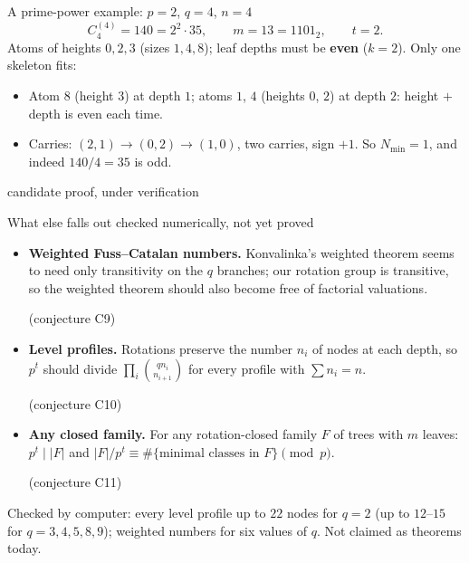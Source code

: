 \documentclass[aspectratio=169,11pt]{beamer}
\newcommand{\claimstatus}{candidate proof, under verification}
\newcommand{\status}{\par\vfill{\tiny\color{gray}\claimstatus\par}}
\begin{document}
\begin{frame}{A prime-power example: $p=2$, $q=4$, $n=4$}
  \[
    C_4^{(4)}=140=2^2\cdot 35,\qquad m=13=1101_2,\qquad t=2 .
  \]
  Atoms of heights $0,2,3$ (sizes $1,4,8$); leaf depths must be \textbf{even}
  ($k=2$). Only one skeleton fits:
  \begin{center}
  \end{center}
  \begin{itemize}
    \item Atom $8$ (height $3$) at depth $1$; atoms $1$, $4$ (heights $0$, $2$) at depth $2$:
          height $+$ depth is even each time.
    \item Carries: $(2,1)\to(0,2)\to(1,0)$, two carries, sign $+1$.
          So $N_{\min}=1$, and indeed $140/4=35$ is odd.
  \end{itemize}
  \status
\end{frame}

\begin{frame}{What else falls out \hfill\normalsize\textcolor{red!70!black}{checked numerically, not yet proved}}
  \begin{itemize}
    \item \textbf{Weighted Fuss--Catalan numbers.}
      Konvalinka's weighted theorem seems to need only transitivity on the $q$
      branches; our rotation group is transitive, so the weighted theorem should
      also become free of factorial valuations.
      \par\hfill{\small(conjecture C9)}
    \item \textbf{Level profiles.}
      Rotations preserve the number $n_i$ of nodes at each depth, so $p^t$ should
      divide $\prod_i\binom{q n_i}{n_{i+1}}$ for every profile with $\sum n_i=n$.
      \par\hfill{\small(conjecture C10)}
    \item \textbf{Any closed family.}
      For any rotation-closed family $F$ of trees with $m$ leaves:
      $p^t\mid|F|$ and $|F|/p^t\equiv\#\{\text{minimal classes in }F\}\pmod p$.
      \par\hfill{\small(conjecture C11)}
  \end{itemize}
  \vfill
  {\small Checked by computer: every level profile up to $22$ nodes for $q=2$ (up to
  $12$--$15$ for $q=3,4,5,8,9$); weighted numbers for six values of $q$.
  Not claimed as theorems today.}
\end{frame}
\end{document}

